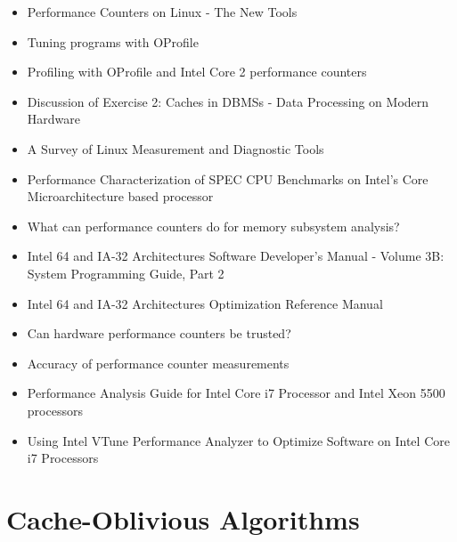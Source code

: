 \begin{itemize}
\item Performance Counters on Linux - The New Tools \cite{Melo2009}
\item Tuning programs with OProfile \cite{Cohen2004}
\item Profiling with OProfile and Intel Core 2 performance counters
  \cite{Nielsen2008}
\item Discussion of Exercise 2: Caches in DBMSs - Data Processing on
  Modern Hardware \cite{Muller2009}
\item A Survey of Linux Measurement and Diagnostic Tools
  \cite{Rowand2009}
\item Performance Characterization of SPEC CPU Benchmarks on Intel's
  Core Microarchitecture based processor \cite{Bird2007}
\item What can performance counters do for memory subsystem analysis?
  \cite{Eranian2008}
\item Intel \textsuperscript{\textregistered} 64 and IA-32
  Architectures Software Developer’s Manual - Volume 3B: System
  Programming Guide, Part 2 \cite{Intel2010}
\item Intel \textsuperscript{\textregistered} 64 and IA-32
  Architectures Optimization Reference Manual \cite{Intel2009}
\item Can hardware performance counters be trusted? \cite{Weaver2008}
\item Accuracy of performance counter measurements
  \cite{Zaparanuks2008}
\item Performance Analysis Guide for Intel
  \textsuperscript{\textregistered} Core
  \textsuperscript{\texttrademark} i7 Processor and Intel
  \textsuperscript{\textregistered} Xeon
  \textsuperscript{\texttrademark} 5500 processors
  \cite{Levinthal2009}
\item Using Intel \textsuperscript{\textregistered} VTune
  \textsuperscript{\texttrademark} Performance Analyzer to Optimize
  Software on Intel \textsuperscript{\textregistered} Core
  \textsuperscript{\texttrademark} i7 Processors \cite{Intel2009a}
\end{itemize}


\section*{Cache-Oblivious Algorithms}
\label{sec:lr-cache-oblivious-algorithms}

